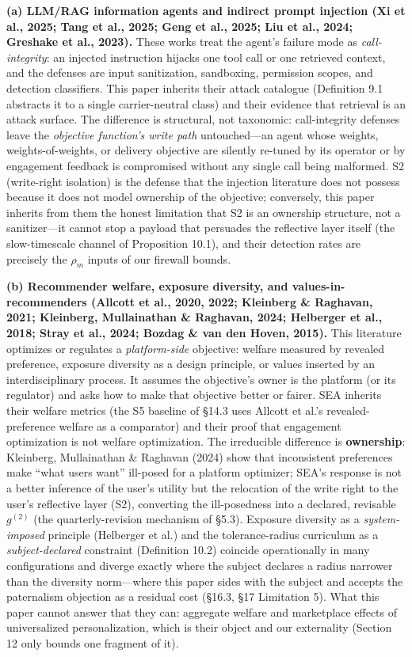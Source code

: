 \documentclass[
  11pt]{article}
\begin{document}
\textbf{(a) LLM/RAG information agents and indirect prompt injection (Xi
et al., 2025; Tang et al., 2025; Geng et al., 2025; Liu et al., 2024;
Greshake et al., 2023).} These works treat the agent's failure mode as
\emph{call-integrity}: an injected instruction hijacks one tool call or
one retrieved context, and the defenses are input sanitization,
sandboxing, permission scopes, and detection classifiers. This paper
inherits their attack catalogue (Definition 9.1 abstracts it to a single
carrier-neutral class) and their evidence that retrieval is an attack
surface. The difference is structural, not taxonomic: call-integrity
defenses leave the \emph{objective function's write path} untouched---an
agent whose weights, weights-of-weights, or delivery objective are
silently re-tuned by its operator or by engagement feedback is
compromised without any single call being malformed. S2 (write-right
isolation) is the defense that the injection literature does not possess
because it does not model ownership of the objective; conversely, this
paper inherits from them the honest limitation that S2 is an ownership
structure, not a sanitizer---it cannot stop a payload that persuades the
reflective layer itself (the slow-timescale channel of Proposition
10.1), and their detection rates are precisely the \(\rho_m\) inputs of
our firewall bounds.

\textbf{(b) Recommender welfare, exposure diversity, and
values-in-recommenders (Allcott et al., 2020, 2022; Kleinberg \&
Raghavan, 2021; Kleinberg, Mullainathan \& Raghavan, 2024; Helberger et
al., 2018; Stray et al., 2024; Bozdag \& van den Hoven, 2015).} This
literature optimizes or regulates a \emph{platform-side} objective:
welfare measured by revealed preference, exposure diversity as a design
principle, or values inserted by an interdisciplinary process. It
assumes the objective's owner is the platform (or its regulator) and
asks how to make that objective better or fairer. SEA inherits their
welfare metrics (the S5 baseline of §14.3 uses Allcott et al.'s
revealed-preference welfare as a comparator) and their proof that
engagement optimization is not welfare optimization. The irreducible
difference is \textbf{ownership}: Kleinberg, Mullainathan \& Raghavan
(2024) show that inconsistent preferences make ``what users want''
ill-posed for a platform optimizer; SEA's response is not a better
inference of the user's utility but the relocation of the write right to
the user's reflective layer (S2), converting the ill-posedness into a
declared, revisable \(g^{(2)}\) (the quarterly-revision mechanism of
§5.3). Exposure diversity as a \emph{system-imposed} principle
(Helberger et al.) and the tolerance-radius curriculum as a
\emph{subject-declared} constraint (Definition 10.2) coincide
operationally in many configurations and diverge exactly where the
subject declares a radius narrower than the diversity norm---where this
paper sides with the subject and accepts the paternalism objection as a
residual cost (§16.3, §17 Limitation 5). What this paper cannot answer
that they can: aggregate welfare and marketplace effects of
universalized personalization, which is their object and our externality
(Section 12 only bounds one fragment of it).
\end{document}
